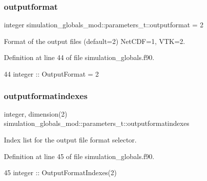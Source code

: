 \subsubsection{\texorpdfstring{outputformat}{outputformat}}
{\footnotesize\ttfamily integer simulation\+\_\+globals\+\_\+mod\+::parameters\+\_\+t\+::outputformat = 2\hspace{0.3cm}{\ttfamily [private]}}



Format of the output files (default=2) Net\+C\+DF=1, V\+TK=2. 



Definition at line 44 of file simulation\+\_\+globals.\+f90.


\begin{DoxyCode}
44         \textcolor{keywordtype}{integer}    :: OutputFormat = 2
\end{DoxyCode}
\mbox{\label{structsimulation__globals__mod_1_1parameters__t_a654359ea7dff5a8a0d57276f44e589b1}} 
\subsubsection{\texorpdfstring{outputformatindexes}{outputformatindexes}}
{\footnotesize\ttfamily integer, dimension(2) simulation\+\_\+globals\+\_\+mod\+::parameters\+\_\+t\+::outputformatindexes\hspace{0.3cm}{\ttfamily [private]}}



Index list for the output file format selector. 



Definition at line 45 of file simulation\+\_\+globals.\+f90.


\begin{DoxyCode}
45         \textcolor{keywordtype}{integer}    :: OutputFormatIndexes(2)
\end{DoxyCode}
\mbox{\label{structsimulation__globals__mod_1_1parameters__t_a8bffd480a278698179e8581a1fdf3c08}} 
